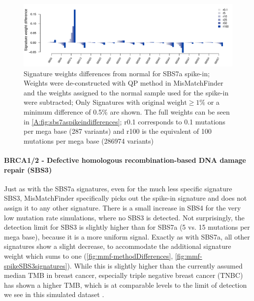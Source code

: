 \begin{figure}[!ht]
\centering
\includegraphics[width=.99\linewidth]{Figures/SBS7SpikeInSignatureDifferencesFocussed.pdf}
\caption[Signature weights differences from normal for SBS7a spike-in]{Signature weights differences from normal for SBS7a spike-in; Weights were de-constructed with QP method in MisMatchFinder and the weights assigned to the normal sample used for the spike-in were subtracted; Only Signatures with $\text{original weight}\geq 1\%$ or a minimum difference of 0.5\% are shown. The full weights can be seen in \protect\autoref{A:fig:sbs7aspikeindifferences}; r0.1 corresponds to 0.1 mutations per mega base (287 variants) and r100 is the equivalent of 100 mutations per mega base (286974 variants)}\label{fig:mmf-spikeSBS7asignatures}
\end{figure}

\paragraph{BRCA1/2 - Defective homologous recombination-based DNA damage repair (SBS3)}
\label{mmf-sec:mbcSim}

Just as with the SBS7a signatures, even for the much less specific signature SBS3, MisMatchFinder specifically picks out the spike-in signature and does not assign it to any other signature. There is a small increase in SBS4 for the very low mutation rate simulations, where no SBS3 is detected. Not surprisingly, the detection limit for SBS3 is slightly higher than for SBS7a (5 vs. 15 mutations per mega base), because it is a more uniform signal. Exactly as with SBS7a, all other signatures show a slight decrease, to accommodate the additional signature weight which sums to one (\autoref{fig:mmf-methodDifferences}, \autoref{fig:mmf-spikeSBS3signatures}). While this is slightly higher than the currently assumed median TMB in breast cancer, especially triple negative breast cancer (TNBC) has shown a higher TMB, which is at comparable levels to the limit of detection we see in this simulated dataset \cite{BarrosoSousa2020}.

